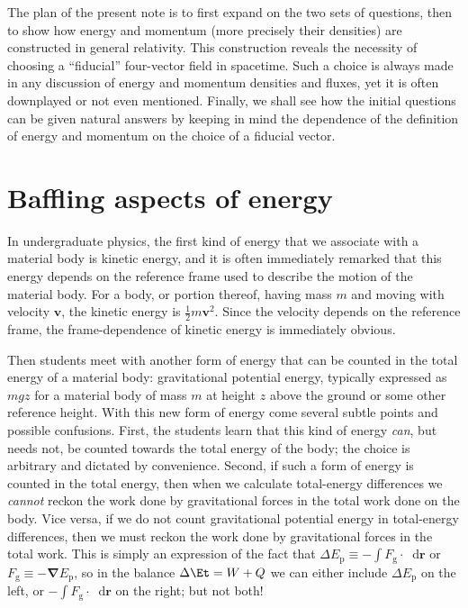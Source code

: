 \documentclass[a4paper,12pt,%
onecolumn,oneside,article,%
british%
]{memoir}
\newcommand*{\di}{\mathop{}\!\mathrm{d}}%
\newcommand*{\nabl}{\bm{\nabla}}%
\newcommand*{\incr}{\Delta}%
\renewcommand*{\|}[1][]{\nonscript\:#1\vert\nonscript\:\mathopen{}}
\newcommand*{\yv}{\bm{v}}
\newcommand*{\ym}{m}
\newcommand*{\yEp}{E_{\textrm{p}}}
\newcommand*{\yG}{F_{\textrm{g}}}
\newcommand*{\yr}{\bm{r}}
\begin{document}
The plan of the present note is to first expand on the two sets of questions, then to show how energy and momentum (more precisely their densities) are constructed in general relativity. This construction reveals the necessity of choosing a \enquote{fiducial} four-vector field in spacetime. Such a choice is always made in any discussion of energy and momentum densities and fluxes, yet it is often downplayed or not even mentioned. Finally, we shall see how the initial questions can be given natural answers by keeping in mind the dependence of the definition of energy and momentum on the choice of a fiducial vector.


\section{Baffling aspects of energy}
\label{sec:questions_energy}

In undergraduate physics, the first kind of energy that we associate with a material body is kinetic energy, and it is often immediately remarked that this energy depends on the reference frame used to describe the motion of the material body. For a body, or portion thereof, having mass $\ym$ and moving with velocity $\yv$, the kinetic energy is $\tfrac12 \ym \yv^2$. Since the velocity depends on the reference frame, the frame-dependence of kinetic energy is immediately obvious.

Then students meet with another form of energy that can be counted in the total energy of a material body: gravitational potential energy, typically expressed as $\ym g z$ for a material body of mass $\ym$ at height $z$ above the ground or some other reference height. With this new form of energy come several subtle points and possible confusions. First, the students learn that this kind of energy \emph{can}, but needs not, be counted towards the total energy of the body; the choice is arbitrary and dictated by convenience. Second, if such a form of energy is counted in the total energy, then when we calculate total-energy differences we \emph{cannot} reckon the work done by gravitational forces in the total work done on the body. Vice versa, if we do not count gravitational potential energy in total-energy differences, then we must reckon the work done by gravitational forces in the total work. This is simply an expression of the fact that $\incr\yEp \equiv -\int\yG\cdot\di\yr$ or $\yG \equiv -\nabl\yEp$, so in the balance $\incr\Et = W + Q$ we can either include $\incr\yEp$ on the left, or $-\int\yG\cdot\di\yr$ on the right; but not both!
\end{document}
